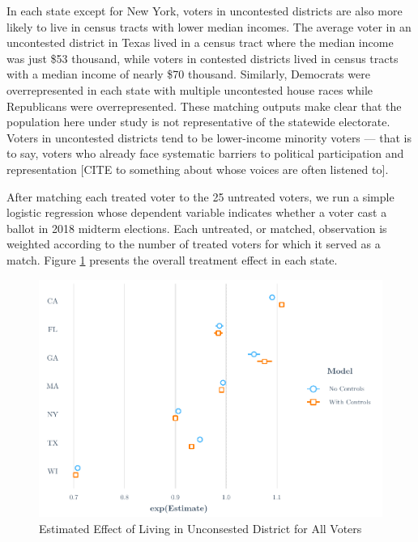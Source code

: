 \documentclass[
  12pt,
]{article}
\begin{document}
In each state except for New York, voters in uncontested districts are also more likely to live in census tracts with lower median incomes. The average voter in an uncontested district in Texas lived in a census tract where the median income was just \$53 thousand, while voters in contested districts lived in census tracts with a median income of nearly \$70 thousand. Similarly, Democrats were overrepresented in each state with multiple uncontested house races while Republicans were overrepresented. These matching outputs make clear that the population here under study is not representative of the statewide electorate. Voters in uncontested districts tend to be lower-income minority voters --- that is to say, voters who already face systematic barriers to political participation and representation {[}CITE to something about whose voices are often listened to{]}.

After matching each treated voter to the 25 untreated voters, we run a simple logistic regression whose dependent variable indicates whether a voter cast a ballot in 2018 midterm elections. Each untreated, or matched, observation is weighted according to the number of treated voters for which it served as a match. Figure \ref{fig:overall-plots} presents the overall treatment effect in each state.

\begin{figure}[H]

{\centering \includegraphics{write_files/figure-latex/overall-plots-1} 

}

\caption{\label{fig:overall-plots}Estimated Effect of Living in Unconsested District for All Voters}\label{fig:overall-plots}
\end{figure}
\end{document}
